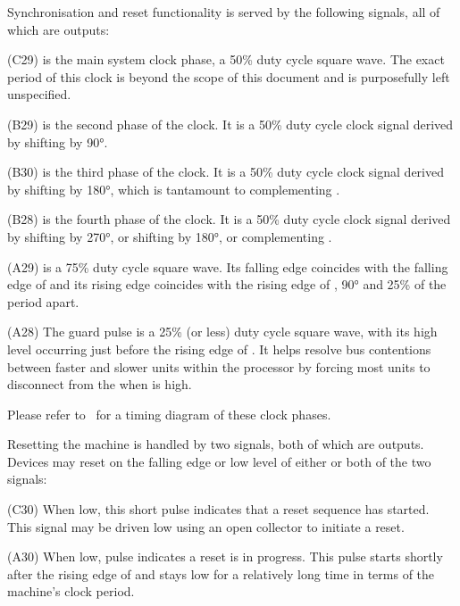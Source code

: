 Synchronisation and reset functionality is served by the following
signals, all of which are outputs:

\begin{description}
  \item{\bfseries {}} (C29) is the main system clock phase, a 50\% duty
    cycle square wave. The exact period of this clock is beyond the
    scope of this document and is purposefully left unspecified.
  \item{\bfseries {}} (B29) is the second phase of the clock. It is a 50\% duty
    cycle clock signal derived by shifting  by 90°.
  \item{\bfseries {}} (B30) is the third phase of the clock. It is a
    50\% duty cycle clock signal derived by shifting  by 180°,
    which is tantamount to complementing .
  \item{\bfseries {}} (B28) is the fourth phase of the clock. It is a
    50\% duty cycle clock signal derived by shifting  by 270°,
    or shifting  by 180°, or complementing .
  \item{\bfseries {}} (A29) is a 75\% duty cycle square wave. Its
    falling edge coincides with the falling edge of  and its
    rising edge coincides with the rising edge of , 90° and
    25\% of the period apart.
  \item{\bfseries\GP} (A28) The guard pulse is a 25\% (or
    less) duty cycle square wave, with its high level occurring just
    before the rising edge of . It helps resolve bus
    contentions between faster and slower units within the processor
    by forcing most units to disconnect from the \IBUS{} when \GP{} is
    high.
\end{description}

Please refer to~ for a timing diagram of these clock phases.

Resetting the machine is handled by two signals, both of which are
outputs. Devices may reset on the falling edge or low level of either
or both of the two signals:

\begin{description}
  \item{\bfseries\RESET} (C30) When low, this short pulse indicates that a
    reset sequence has started. This signal may be driven low using an
    open collector to initiate a reset.
  \item{\bfseries\RSTHOLD} (A30) When low, pulse indicates a reset is in
    progress. This pulse starts shortly after the rising edge of
    \RESET{} and stays low for a relatively long time in terms of the
    machine's clock period.
\end{description}


